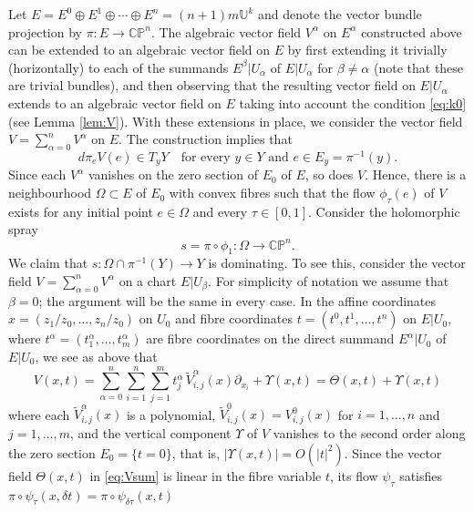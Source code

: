 \documentclass[12pt]{amsart}
\theoremstyle{definition}
\numberwithin{equation}{section}
\numberwithin{figure}{section}
\newcommand\CP{\mathbb{CP}}
\newcommand\U{\mathbb{U}}
\newcommand\wt{\widetilde}
\newcommand\di{\partial}
\numberwithin{equation}{section}
\begin{document}
Let $E=E^0\oplus E^1\oplus \cdots\oplus E^n=(n+1)m\U^k$ 
and denote the vector bundle projection by $\pi:E \to \CP^n$.
The algebraic vector field $V^\alpha$ on $E^\alpha$ constructed above
can be extended to an algebraic vector field on $E$ by first extending
it trivially (horizontally) to each of the summands $E^\beta|U_\alpha$
of $E|U_\alpha$ for $\beta\ne \alpha$ (note that these are trivial bundles), 
and then observing that the resulting vector field on $E|U_\alpha$ 
extends to an algebraic vector field on $E$ taking into account the condition \eqref{eq:k0} (see Lemma \ref{lem:V}). With these extensions in place, 
we consider the vector field $V=\sum_{\alpha=0}^n V^\alpha$ on $E$.
The construction implies that
\[ 
	d\pi_e V(e)\in T_yY\quad 
	\text{for every $y\in Y$ and $e\in E_y=\pi^{-1}(y)$}.
\] 
Since each $V^\alpha$ vanishes on the zero section
of $E_0$ of $E$, so does $V$. 
Hence, there is a neighbourhood $\Omega\subset E$
of $E_0$ with convex fibres such that the flow $\phi_\tau(e)$ of $V$ 
exists for any initial point $e\in \Omega$ and every $\tau\in[0,1]$.
Consider the holomorphic spray 
\begin{equation}\label{eq:localspray}
	s=\pi \circ \phi_1:\Omega\to \CP^n. 
\end{equation}
We claim that $s:\Omega\cap \pi^{-1}(Y)\to Y$ is dominating. 
To see this, consider the vector field $V=\sum_{\alpha=0}^n V^\alpha$ 
on a chart $E|U_\beta$.
For simplicity of notation we assume that $\beta=0$;
the argument will be the same in every case. In the affine coordinates 
$x=(z_1/z_0,\ldots,z_n/z_0)$ on $U_0$ and fibre coordinates
$t=(t^0,t^1,\ldots,t^n)$ on $E|U_0$, where 
$t^\alpha = (t^\alpha_1,\ldots,t^\alpha_m)$ are 
fibre coordinates on the direct summand $E^\alpha|U_0$ 
of $E|U_0$, we see as above 
that 
\begin{equation}\label{eq:Vsum}
	V(x,t) = \sum_{\alpha=0}^n \sum_{i=1}^n 
	\sum_{j=1}^m t^\alpha_j \, \wt V^\alpha_{i,j}(x) \di_{x_i}
	+ \Upsilon(x,t)
	= \Theta(x,t)+\Upsilon(x,t)
\end{equation}
where each $\wt V^\alpha_{i,j}(x)$ is a polynomial, 
$\wt V^0_{i,j}(x)=V^0_{i,j}(x)$ for $i=1,\ldots,n$ and $j=1,\ldots,m$,  
and the vertical component $\Upsilon$ of $V$ vanishes to the second 
order along the zero section $E_0=\{t=0\}$, that is, $|\Upsilon(x,t)|=O(|t|^2)$. 
Since the vector field $\Theta(x,t)$ in \eqref{eq:Vsum}
is linear in the fibre variable $t$, its flow $\psi_\tau$ satisfies 
$\pi\circ \psi_\tau(x, \delta t) = \pi\circ \psi_{\delta \tau}(x,t)$
\end{document}
